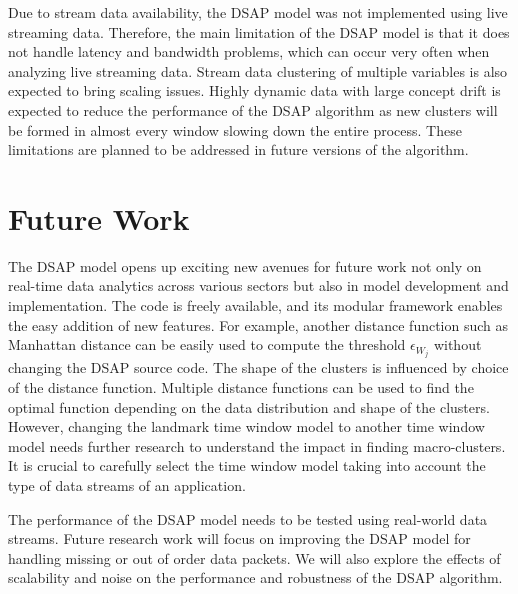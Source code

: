 Due to stream data availability, the DSAP model was not implemented using live streaming data. Therefore, the main limitation of the DSAP model is that it does not handle latency and bandwidth problems, which can occur very often when analyzing live streaming data.  Stream data clustering of multiple variables is also expected to bring scaling issues. Highly dynamic data with large concept drift is expected to reduce the performance of the DSAP algorithm as new clusters will be formed in almost every window slowing down the entire process. These limitations are planned to be addressed in future versions of the algorithm.



\section{Future Work}

The DSAP model opens up exciting new avenues for future work not only on real-time data analytics across various sectors but also in model development and implementation. The code is freely available, and its modular framework enables the easy addition of new features. For example, another distance function such as Manhattan distance can be easily used to compute the threshold $\epsilon_{W_j}$ without changing the DSAP source code. The shape of the clusters is influenced by choice of the distance function. Multiple distance functions can be used to find the optimal function depending on the data distribution and shape of the clusters. However, changing the landmark time window model to another time window model needs further research to understand the impact in finding macro-clusters. It is crucial to carefully select the time window model taking into account the type of data streams of an application.

The performance of the DSAP model needs to be tested using real-world data streams. Future research work will focus on improving the DSAP model for handling missing or out of order data packets. We will also explore the effects of scalability and noise on the performance and robustness of the DSAP algorithm.

